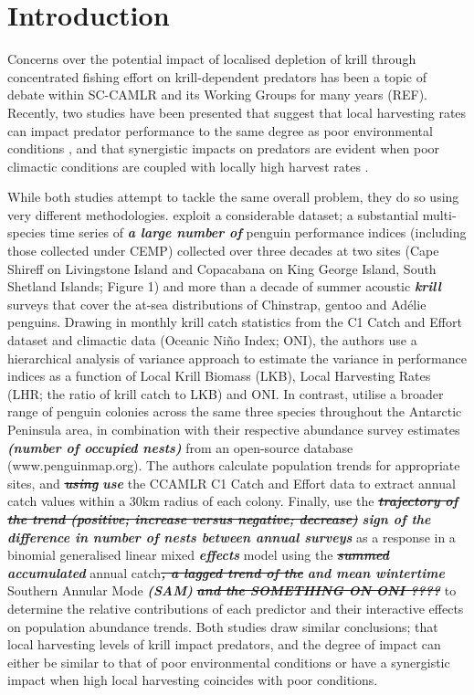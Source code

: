 \documentclass[]{elsarticle} %
\begin{document}
\section{Introduction}\label{introduction}

Concerns over the potential impact of localised depletion of krill
through concentrated fishing effort on krill-dependent predators has
been a topic of debate within SC-CAMLR and its Working Groups for many
years (REF). Recently, two studies have been presented that suggest that
local harvesting rates can impact predator performance to the same
degree as poor environmental conditions \citep{Watters2020}, and that
synergistic impacts on predators are evident when poor climactic
conditions are coupled with locally high harvest rates
\citep{Kruger2021}.

While both studies attempt to tackle the same overall problem, they do
so using very different methodologies. \citet{Watters2020} exploit a
considerable dataset; a substantial multi-species time series of
\textbf{\emph{a large number of}} penguin performance indices (including
those collected under CEMP) collected over three decades at two sites
(Cape Shireff on Livingstone Island and Copacabana on King George
Island, South Shetland Islands; Figure 1) and more than a decade of
summer acoustic \textbf{\emph{krill}} surveys that cover the at-sea
distributions of Chinstrap, gentoo and Adélie penguins. Drawing in
monthly krill catch statistics from the C1 Catch and Effort dataset and
climactic data (Oceanic Niño Index; ONI), the authors use a hierarchical
analysis of variance approach to estimate the variance in performance
indices as a function of Local Krill Biomass (LKB), Local Harvesting
Rates (LHR; the ratio of krill catch to LKB) and ONI. In contrast,
\citet{Kruger2021} utilise a broader range of penguin colonies across
the same three species throughout the Antarctic Peninsula area, in
combination with their respective abundance survey estimates
\textbf{\emph{(number of occupied nests)}} from an open-source database
(www.penguinmap.org). The authors calculate population trends for
appropriate sites, and \textbf{\emph{\st{using}}} \textbf{\emph{use}}
the CCAMLR C1 Catch and Effort data to extract annual catch values
within a 30km radius of each colony. Finally, \citet{Kruger2021} use the
\textbf{\emph{\st{trajectory of the trend (positive; increase versus
negative; decrease)}}} \textbf{\emph{sign of the difference in number of
nests between annual surveys}} as a response in a binomial generalised
linear mixed \textbf{\emph{effects}} model using the
\textbf{\emph{\st{summed}}} \textbf{\emph{accumulated}} annual
catch\textbf{\emph{\st{, a lagged trend of the}}} \textbf{\emph{and mean
wintertime}} Southern Annular Mode \textbf{\emph{(SAM)}}
\textbf{\emph{\st{and the SOMETHING ON ONI ????}}} to determine the
relative contributions of each predictor and their interactive effects
on population abundance trends. Both studies draw similar conclusions;
that local harvesting levels of krill impact predators, and the degree
of impact can either be similar to that of poor environmental conditions
or have a synergistic impact when high local harvesting coincides with
poor conditions.
\end{document}
